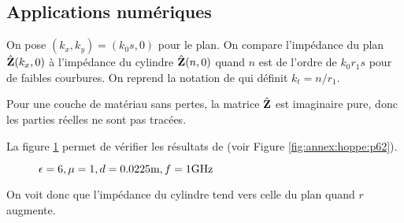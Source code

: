   \subsection{Applications numériques}

    On pose \((k_x,k_y) = (k_0 s, 0)\) pour le plan.
    On compare l'impédance du plan \(\hat{\mathbf{Z}}(k_x,0)\) à l'impédance du cylindre \(\hat{\mathbf{Z}}(n,0)\) quand \(n\) est de l'ordre de \(k_0r_1s\) pour de faibles courbures.
    On reprend la notation de \cite[p.~62]{hoppe_impedance_1995} qui définit \(k_t= n/r_1\).

    Pour une couche de matériau sans pertes, la matrice \(\hat{\mathbf{Z}}\) est imaginaire pure, donc les parties réelles ne sont pas tracées.

    La figure \ref{fig:imp_fourier:cylindre:hoppe_p62:converge_rayon} permet de vérifier les résultats de \cite[p.~62]{hoppe_impedance_1995} (voir Figure \ref{fig:annex:hoppe:p62}).

    \begin{figure}[!hbt]
      \centering
      
      \caption{\(\epsilon = 6, \mu = 1, d=0.0225\text{m}, f=1\text{GHz}\)}
      \label{fig:imp_fourier:cylindre:hoppe_p62:converge_rayon}
    \end{figure}
    On voit donc que l'impédance du cylindre tend vers celle du plan quand \(r\) augmente.



